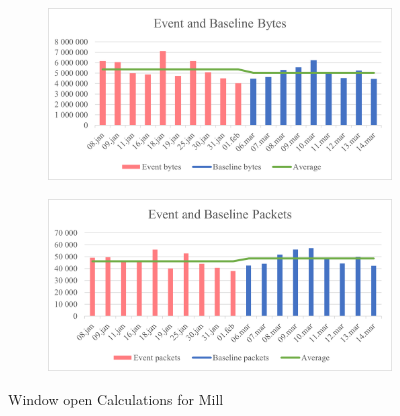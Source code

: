 \begin{figure}[H]
    \centering
    \begin{subfigure}{1\textwidth}
        \centering
        \includegraphics[width=1\hsize]{figures/Mill_Window_Calculations_Bytes.png} 
    \end{subfigure}
    \begin{subfigure}{1\textwidth}
        \centering
        \includegraphics[width=1\hsize]{figures/Mill_Window_Calculations_Packets.png} 
    \end{subfigure}
    \caption{Window open Calculations for Mill}
    \label{fig:MillWindowCalculations}
\end{figure}

